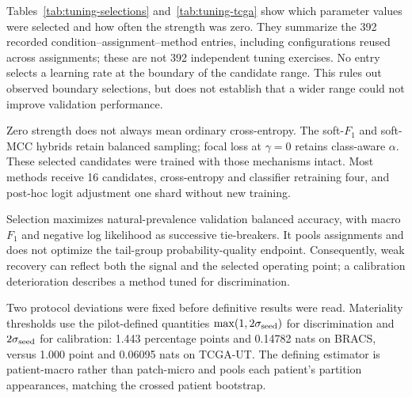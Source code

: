 Tables~\ref{tab:tuning-selections} and~\ref{tab:tuning-tcga} show which parameter values were selected and how often the strength was zero. They summarize the \num{392} recorded condition--assignment--method entries, including configurations reused across assignments; these are not \num{392} independent tuning exercises. No entry selects a learning rate at the boundary of the candidate range. This rules out observed boundary selections, but does not establish that a wider range could not improve validation performance.

\begin{table}[H]
\centering\small

\caption{BRACS tuning summary. Ranges span recorded selections; zero-strength counts use entries with a strength parameter as denominator. Strength has a method-specific meaning and cannot be compared numerically across methods.}
\label{tab:tuning-selections}
\end{table}
\begin{table}[H]
\centering\small

\caption{TCGA-UT tuning summary, using the same conventions as Table~\ref{tab:tuning-selections}. Post-hoc logit adjustment reuses the cross-entropy checkpoint.}
\label{tab:tuning-tcga}
\end{table}

\noindent Zero strength does not always mean ordinary cross-entropy. The soft-$F_1$ and soft-MCC hybrids retain balanced sampling; focal loss at $\gamma=0$ retains class-aware $\alpha$. These selected candidates were trained with those mechanisms intact. Most methods receive \num{16} candidates, cross-entropy and classifier retraining four, and post-hoc logit adjustment one shard without new training.

Selection maximizes natural-prevalence validation balanced accuracy, with macro $F_1$ and negative log likelihood as successive tie-breakers. It pools assignments and does not optimize the tail-group probability-quality endpoint. Consequently, weak recovery can reflect both the signal and the selected operating point; a calibration deterioration describes a method tuned for discrimination.

Two protocol deviations were fixed before definitive results were read. Materiality thresholds use the pilot-defined quantities $\max(1,2\sigma_{\rm seed})$ for discrimination and $2\sigma_{\rm seed}$ for calibration: \num{1.443} percentage points and \num{0.14782} nats on BRACS, versus \num{1.000} point and \num{0.06095} nats on TCGA-UT. The defining estimator is patient-macro rather than patch-micro and pools each patient's partition appearances, matching the crossed patient bootstrap.


